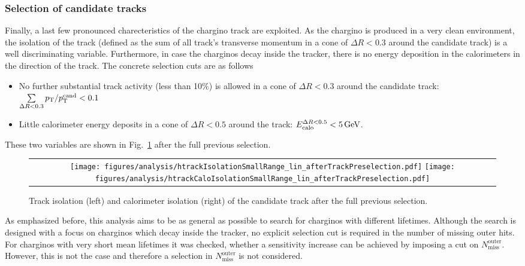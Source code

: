 \subsubsection*{Selection of candidate tracks}
Finally, a last few pronounced charecteristics of the chargino track are exploited.
As the chargino is produced in a very clean environment, the isolation of the track (defined as the sum of all track's transverse momentum in a cone of $\Delta R < 0.3$ around the candidate track) is a well discriminating variable.
Furthermore, in case the charginos decay inside the tracker, there is no energy deposition in the calorimeters in the direction of the track.
The concrete selection cuts are as follows
\begin{itemize}
\renewcommand{\labelitemi}{\footnotesize{\ding{118}}}
\item No further substantial track activity (less than 10\%) is allowed in a cone of $\Delta R < 0.3$ around the candidate track: \mbox{$\sum \limits_{\Delta R < 0.3} p_{\text{T}}/p_{\text{T}}^{\text{cand}} < 0.1$}
\item Little calorimeter energy deposits in a cone of $\Delta R < 0.5$ around the track: \mbox{$E^{\Delta R<0.5}_{\text{calo}}<5\,\text{Ge}\kern-0.06667em\text{V}$}.
\end{itemize}
These two variables are shown in Fig.~\ref{fig:TrackIso_Ecalo_After_Preselection} after the full previous selection.\\
\begin{figure}[!t]
  \centering 
  \begin{tabular}{c}
    \texttt{[image: figures/analysis/htrackIsolationSmallRange\_lin\_afterTrackPreselection.pdf]}
    \texttt{[image: figures/analysis/htrackCaloIsolationSmallRange\_lin\_afterTrackPreselection.pdf]}
  \end{tabular}
  \caption{Track isolation (left) and calorimeter isolation (right) of the candidate track after the full previous selection.}
  \label{fig:TrackIso_Ecalo_After_Preselection}
\end{figure}

As emphasized before, this analysis aims to be as general as possible to search for charginos with different lifetimes.
Although the search is designed with a focus on charginos which decay inside the tracker, no explicit selection cut is required in the number of missing outer hits.
For charginos with very short mean lifetimes it was checked, whether a sensitivity increase can be achieved by imposing a cut on $N_{\text{miss}}^{\text{outer}}$.
However, this is not the case and therefore a selection in $N_{\text{miss}}^{\text{outer}}$ is not considered.

